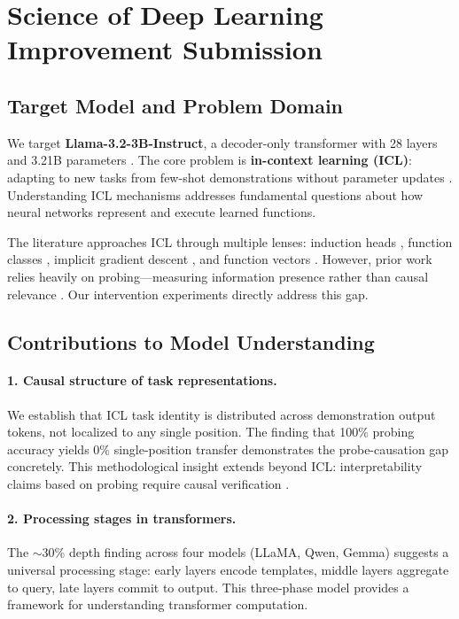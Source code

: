 \documentclass{article}
\begin{document}



\newpage
\section*{Science of Deep Learning Improvement Submission}

\subsection*{Target Model and Problem Domain}

We target \textbf{Llama-3.2-3B-Instruct}, a decoder-only transformer with 28 layers and 3.21B parameters \citep{touvron2023llama}. The core problem is \textbf{in-context learning (ICL)}: adapting to new tasks from few-shot demonstrations without parameter updates \citep{brown2020language}. Understanding ICL mechanisms addresses fundamental questions about how neural networks represent and execute learned functions.

The literature approaches ICL through multiple lenses: induction heads \citep{olsson2022context}, function classes \citep{garg2022can}, implicit gradient descent \citep{dai2022can,vonoswald2023transformers}, and function vectors \citep{todd2023function,hendel2023context}. However, prior work relies heavily on probing---measuring information presence rather than causal relevance \citep{belinkov2019analysis}. Our intervention experiments directly address this gap.

\subsection*{Contributions to Model Understanding}

\paragraph{1. Causal structure of task representations.} We establish that ICL task identity is distributed across demonstration output tokens, not localized to any single position. The finding that 100\% probing accuracy yields 0\% single-position transfer demonstrates the probe-causation gap concretely. This methodological insight extends beyond ICL: interpretability claims based on probing require causal verification \citep{ravfogel2020null,elazar2021amnesic}.

\paragraph{2. Processing stages in transformers.} The $\sim$30\% depth finding across four models (LLaMA, Qwen, Gemma) suggests a universal processing stage: early layers encode templates, middle layers aggregate to query, late layers commit to output. This three-phase model provides a framework for understanding transformer computation.
\end{document}
